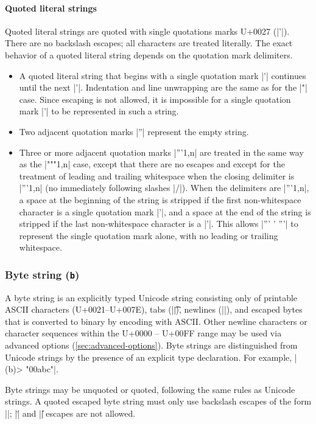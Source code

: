 \documentclass[11pt]{article}
\begin{document}
\paragraph{Quoted literal strings}

Quoted literal strings are quoted with single quotations marks U+0027 (|'|).  There are no backslash escapes; all characters are treated literally.  The exact behavior of a quoted literal string depends on the quotation mark delimiters.
\begin{itemize}
\item A quoted literal string that begins with a single quotation mark |'| continues until the next |'|.  Indentation and line unwrapping are the same as for the |"| case.  Since escaping is not allowed, it is impossible for a single quotation mark |'| to be represented in such a string.
\item Two adjacent quotation marks |''| represent the empty string.
\item Three or more adjacent quotation marks |'''{1,n}| are treated in the same way as the |"""{1,n}| case, except that there are no escapes and except for the treatment of leading and trailing whitespace when the closing delimiter is |'''{1,n}| (no immediately following slashes |/|).  When the delimiters are |'''{1,n}|, a space at the beginning of the string is stripped if the first non-whitespace character is a single quotation mark |'|, and a space at the end of the string is stripped if the last non-whitespace character is a |'|.  This allows |''' ' '''| to represent the single quotation mark alone, with no leading or trailing whitespace.
\end{itemize}


\subsubsection{Byte string (\texttt{b})}

A byte string is an explicitly typed Unicode string consisting only of printable ASCII characters (U+0021--U+007E), tabs (|\t|), newlines (|\n|), and escaped bytes that is converted to binary by encoding with ASCII.  Other newline characters or character sequences within the U+0000 -- U+00FF range may be used via advanced options (\cref{sec:advanced-options}).  Byte strings are distinguished from Unicode strings by the presence of an explicit type declaration.  For example, |(b)> "\x00abc"|.

Byte strings may be unquoted or quoted, following the same rules as Unicode strings.  A quoted escaped byte string must only use backslash escapes of the form |\xHH|; |\u| and |\U| escapes are not allowed.
\end{document}

